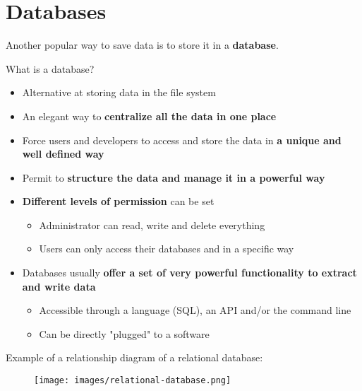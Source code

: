 \documentclass[handout]{beamer}[10pt, usepdftitle=false]
\begin{document}
	\section{Databases}
	
	\begin{frame}
	
	Another popular way to save data is to store it in a \textbf{database}.	
	\vspace*{0.6em}	
	
	What is a database?
	\vspace*{0.6em}
	
	\begin{itemize}
	\item{Alternative at storing data in the file system}
	\item{An elegant way to \textbf{centralize all the data in one place}}
	\item{Force users and developers to access and store the data in \textbf{a unique and well defined way}}
	\item{Permit to \textbf{structure the data and manage it in a powerful way}}
	\item{\textbf{Different levels of permission} can be set
		\begin{itemize}
			\item{Administrator can read, write and delete everything}
			\item{Users can only access their databases and in a specific way}
		\end{itemize}			
	}

	\item{Databases usually \textbf{offer a set of very powerful functionality to extract and write data}
		\begin{itemize}
			\item{Accessible through a language (SQL), an API and/or the command line}
			\item{Can be directly "plugged" to a software}
		\end{itemize}
	}
	\end{itemize}
	
	\end{frame}	
	
	\begin{frame}

	Example of a relationship diagram of a relational database:
	\vspace*{0.6em}
	
	\begin{center}	
	\begin{figure}
		\texttt{[image: images/relational-database.png]} 
	\end{figure}	
	\end{center}
 		
	\end{frame}
		
\end{document}
